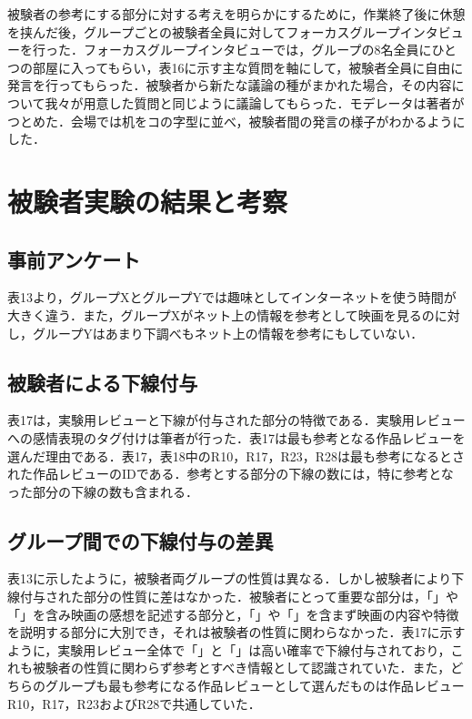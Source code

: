 \documentclass[japanese]{jnlp_1.3a}
\begin{document}
被験者の参考にする部分に対する考えを明らかにするために，作業終了後に休憩を挟んだ後，グループごとの被験者全員に対してフォーカスグループインタビューを行った．フォーカスグループインタビューでは，グループの8名全員にひとつの部屋に入ってもらい，表16に示す主な質問を軸にして，被験者全員に自由に発言を行ってもらった．被験者から新たな議論の種がまかれた場合，その内容について我々が用意した質問と同じように議論してもらった．モデレータは著者がつとめた．会場では机をコの字型に並べ，被験者間の発言の様子がわかるようにした．

\section{被験者実験の結果と考察}

\subsection{事前アンケート}

表13より，グループXとグループYでは趣味としてインターネットを使う時間が大きく違う．また，グループXがネット上の情報を参考として映画を見るのに対し，グループYはあまり下調べもネット上の情報を参考にもしていない．

\subsection{被験者による下線付与}

表17は，実験用レビューと下線が付与された部分の特徴である．実験用レビューへの感情表現のタグ付けは筆者が行った．表17は最も参考となる作品レビューを選んだ理由である．表17，表18中のR10，R17，R23，R28は最も参考になるとされた作品レビューのIDである．参考とする部分の下線の数には，特に参考となった部分の下線の数も含まれる．

\begin{table}[b]

\end{table}

\subsection{グループ間での下線付与の差異}

表13に示したように，被験者両グループの性質は異なる．しかし被験者により下線付与された部分の性質に差はなかった．被験者にとって重要な部分は，「」や「」を含み映画の感想を記述する部分と，「」や「」を含まず映画の内容や特徴を説明する部分に大別でき，それは被験者の性質に関わらなかった．表17に示すように，実験用レビュー全体で「」と「」は高い確率で下線付与されており，これも被験者の性質に関わらず参考とすべき情報として認識されていた．また，どちらのグループも最も参考になる作品レビューとして選んだものは作品レビューR10，R17，R23およびR28で共通していた．
\end{document}
